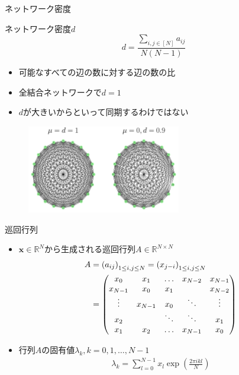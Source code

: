 \begin{frame}{ネットワーク密度}
    \begin{block}{ネットワーク密度$d$}
        \[
            d = \frac{\sum_{i,j\in[N]}a_{ij}}{N(N-1)}
        \]
    \end{block}
    \begin{itemize}
        \item 可能なすべての辺の数に対する辺の数の比
        \item 全結合ネットワークで$d=1$
        \item $d$が大きいからといって同期するわけではない
    \end{itemize}
    \begin{figure}
        \begin{center}
            \includegraphics[width=0.6\textwidth]{figs/density.pdf}
        \end{center}
    \end{figure}
\end{frame}

\begin{frame}{巡回行列}
\begin{itemize}
\item $\bm{x}\in \mathbb{R}^{N}$から生成される巡回行列$A\in\mathbb{R}^{N\times N}$
\begin{align*}
A &= \left(a_{ij}\right)_{1\leq i,j\leq N}=\left(x_{j-i}\right)_{1\leq i,j\leq N}\notag\\
&=
\begin{pmatrix}
    x_{0} & x_{1} & \dots & x_{N-2} & x_{N-1}\\
    x_{N-1} & x_{0} & x_{1} &  & x_{N-2}\\
    \vdots & x_{N-1} & x_{0} & \ddots & \vdots\\
    x_{2} &  & \ddots & \ddots & x_{1}\\
    x_{1} & x_{2} & \dots & x_{N-1} & x_{0}
\end{pmatrix}
\end{align*}
\item 行列$A$の固有値$\lambda_{k},k=0,1,\dots,N-1$
\begin{align*}
\lambda_{k}=\sum_{l=0}^{N-1}x_{l}\exp\left(\frac{2\pi ikl}{N}\right)
\end{align*}
\end{itemize}
\end{frame}

